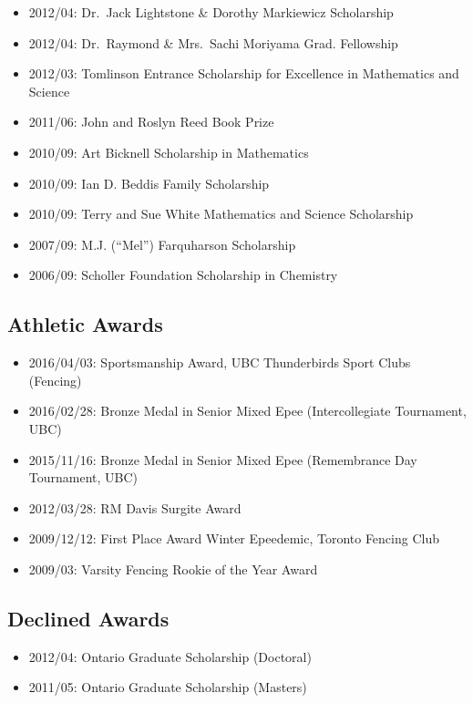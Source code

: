 \documentclass[]{book}
\providecommand{\tightlist}{%
  \setlength{\itemsep}{0pt}\setlength{\parskip}{0pt}}
\begin{document}
\begin{itemize}
\tightlist
\item
  2012/04: Dr.~Jack Lightstone \& Dorothy Markiewicz Scholarship
\item
  2012/04: Dr.~Raymond \& Mrs.~Sachi Moriyama Grad. Fellowship
\item
  2012/03: Tomlinson Entrance Scholarship for Excellence in Mathematics and Science
\item
  2011/06: John and Roslyn Reed Book Prize
\item
  2010/09: Art Bicknell Scholarship in Mathematics
\item
  2010/09: Ian D. Beddis Family Scholarship
\item
  2010/09: Terry and Sue White Mathematics and Science Scholarship
\item
  2007/09: M.J. (``Mel'') Farquharson Scholarship
\item
  2006/09: Scholler Foundation Scholarship in Chemistry
\end{itemize}

\hypertarget{athletic-awards}{%
\subsection{Athletic Awards}\label{athletic-awards}}

\begin{itemize}
\tightlist
\item
  2016/04/03: Sportsmanship Award, UBC Thunderbirds Sport Clubs (Fencing)
\item
  2016/02/28: Bronze Medal in Senior Mixed Epee (Intercollegiate Tournament, UBC)
\item
  2015/11/16: Bronze Medal in Senior Mixed Epee (Remembrance Day Tournament, UBC)
\item
  2012/03/28: RM Davis Surgite Award
\item
  2009/12/12: First Place Award Winter Epeedemic, Toronto Fencing Club
\item
  2009/03: Varsity Fencing Rookie of the Year Award
\end{itemize}

\hypertarget{declined-awards}{%
\subsection{Declined Awards}\label{declined-awards}}

\begin{itemize}
\tightlist
\item
  2012/04: Ontario Graduate Scholarship (Doctoral)
\item
  2011/05: Ontario Graduate Scholarship (Masters)
\end{itemize}
\end{document}
